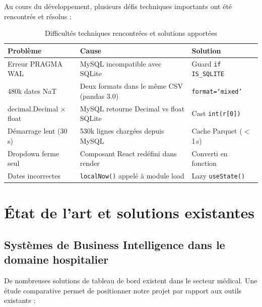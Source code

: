 \documentclass[12pt,a4paper]{report}
\begin{document}
	Au cours du développement, plusieurs défis techniques importants ont été rencontrés et résolus :
	
	\begin{table}[H]
		\centering
		\caption{Difficultés techniques rencontrées et solutions apportées}
		\renewcommand{\arraystretch}{1.2}
		\begin{tabularx}{\textwidth}{lXX}
			\toprule
			\textbf{Problème} & \textbf{Cause} & \textbf{Solution} \\
			\midrule
			Erreur PRAGMA WAL    & MySQL incompatible avec SQLite & Guard \texttt{if IS\_SQLITE} \\
			480k dates NaT       & Deux formats dans le même CSV (pandas 3.0) & \texttt{format=`mixed'} \\
			decimal.Decimal × float & MySQL retourne Decimal vs float SQLite & Cast \texttt{int(r[0])} \\
			Démarrage lent (30\,s) & 530k lignes chargées depuis MySQL & Cache Parquet ($<$1\,s) \\
			Dropdown ferme seul  & Composant React redéfini dans render & Converti en fonction \\
			Dates incorrectes    & \texttt{localNow()} appelé à module load & Lazy \texttt{useState()} \\
			\bottomrule
		\end{tabularx}
	\end{table}
	\newpage
	
	\section{État de l'art et solutions existantes}
	
	\subsection{Systèmes de Business Intelligence dans le domaine hospitalier}
	
	De nombreuses solutions de tableau de bord existent dans le secteur médical. Une étude
	comparative permet de positionner notre projet par rapport aux outils existants :
	
\end{document}
